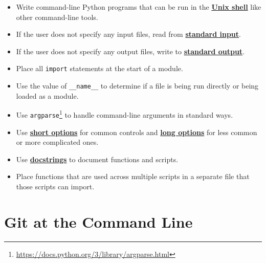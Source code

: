\documentclass[
]{krantz}
\providecommand{\tightlist}{%
  \setlength{\itemsep}{0pt}\setlength{\parskip}{0pt}}
\renewcommand{\href}[2]{#2\footnote{\url{#1}}}
\newcommand{\gref}[2]{\hyperlink{#2}{\textbf{#1}}}
\begin{document}
\begin{itemize}
\tightlist
\item
  Write command-line Python programs that can be run in the \gref{Unix shell}{shell} like other command-line tools.
\item
  If the user does not specify any input files, read from \gref{standard input}{stdin}.
\item
  If the user does not specify any output files, write to \gref{standard output}{stdout}.
\item
  Place all \texttt{import} statements at the start of a module.
\item
  Use the value of \texttt{\_\_name\_\_} to determine if a file is being run directly or being loaded as a module.
\item
  Use \href{https://docs.python.org/3/library/argparse.html}{\texttt{argparse}} to handle command-line arguments in standard ways.
\item
  Use \gref{short options}{short\_option} for common controls and \gref{long options}{long\_option} for less common or more complicated ones.
\item
  Use \gref{docstrings}{docstring} to document functions and scripts.
\item
  Place functions that are used across multiple scripts in a separate file that those scripts can import.
\end{itemize}

\hypertarget{git-at-the-command-line-1}{%
\section{Git at the Command Line}\label{git-at-the-command-line-1}}
\end{document}
